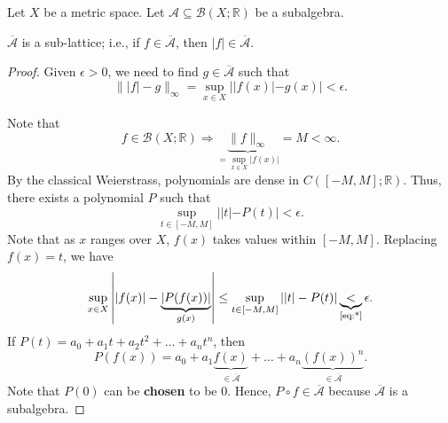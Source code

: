 \documentclass[letterpaper, reqno,11pt]{article}
\newcommand{\RR}{\mathbb{R}}
\begin{document}
\begin{prop}
  \normalfont Let $X$ be a metric space. Let $\mathcal A \subseteq \mathcal B(X; \RR)$ be a subalgebra.

   $\overline{\mathcal A}$ is a sub-lattice; i.e., if $f \in \overline{\mathcal A}$, then $|f| \in \overline{\mathcal A}$.
\end{prop}

\begin{proof}
  Given $\epsilon > 0$, we need to find $g \in \overline{\mathcal A}$ such that
  $$ \lVert |f| - g \rVert_\infty = \sup_{x \in X} ||f(x)| - g(x)| < \epsilon. $$

  \begin{figure}[H]
    \centering
  \end{figure}

  Note that
  $$ f \in \mathcal B(X; \RR) \Rightarrow \underbrace{\lVert f \rVert_\infty}_{=\sup_{x \in X} |f(x)|} = M < \infty. $$
  By the classical Weierstrass, polynomials are dense in $C([-M, M]; \RR)$. Thus, there exists a polynomial $P$ such that
  \begin{equation} \label{eq:*} \tag{*}
    \sup_{t \in [-M, M]} ||t| - P(t)| < \epsilon.
  \end{equation}
  Note that as $x$ ranges over $X$, $f(x)$ takes values within $[-M, M]$. Replacing $f(x) = t$, we have
  $$ \sup_{x \in X} \left||f(x)| - \underbrace{|P(f(x))|}_{g(x)}\right| \leq \sup_{t \in [-M, M]} ||t| - P(t)| \underbrace{<}_\text{\eqref{eq:*}} \epsilon. $$
  If $P(t) = a_0 + a_1 t + a_2 t^2 + \ldots + a_n t^n$, then
  $$ P(f(x)) = a_0 + a_1 \underbrace{f(x)}_{\in \overline{\mathcal A}} + \ldots + a_n \underbrace{(f(x))^n}_{\in \overline{\mathcal A}}. $$
  Note that $P(0)$ can be {\bf chosen} to be $0$. Hence, $P \circ f \in \overline{\mathcal A}$ because $\overline{\mathcal A}$ is a subalgebra.
\end{proof}
\end{document}
